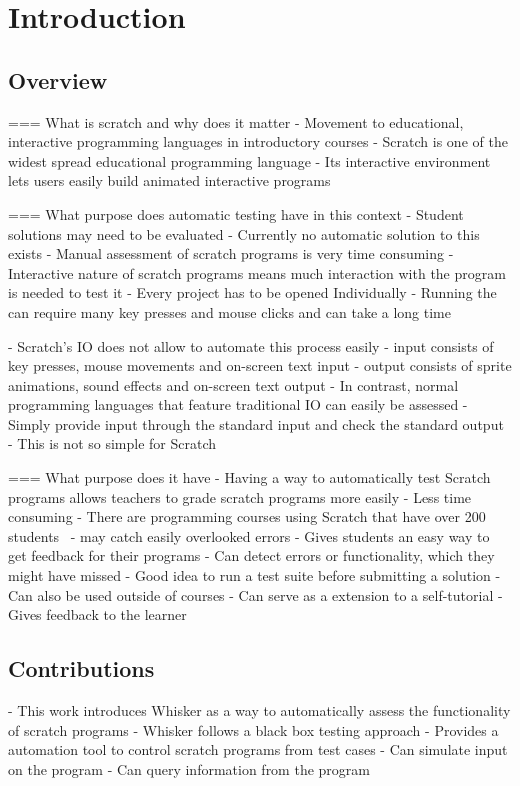 \chapter{Introduction}

\section{Overview}
=== What is scratch and why does it matter
- Movement to educational, interactive programming languages in introductory courses
- Scratch is one of the widest spread educational programming language
- Its interactive environment lets users easily build animated interactive programs

=== What purpose does automatic testing have in this context
- Student solutions may need to be evaluated
- Currently no automatic solution to this exists
- Manual assessment of scratch programs is very time consuming
- Interactive nature of scratch programs means much interaction with the program is needed to test it
- Every project has to be opened Individually
- Running the can require many key presses and mouse clicks and can take a long time

- Scratch's IO does not allow to automate this process easily
    - input consists of key presses, mouse movements and on-screen text input
    - output consists of sprite animations, sound effects and on-screen text output
- In contrast, normal programming languages that feature traditional IO can easily be assessed
- Simply provide input through the standard input and check the standard output
- This is not so simple for Scratch

=== What purpose does it have
- Having a way to automatically test Scratch programs allows teachers to grade scratch programs more easily
    - Less time consuming
        - There are programming courses using Scratch that have over 200 students~\cite{itch}
    - may catch easily overlooked errors
    - Gives students an easy way to get feedback for their programs
        - Can detect errors or functionality, which they might have missed
        - Good idea to run a test suite before submitting a solution
- Can also be used outside of courses
    - Can serve as a extension to a self-tutorial
    - Gives feedback to the learner

\section{Contributions}
- This work introduces Whisker as a way to automatically assess the functionality of scratch programs
- Whisker follows a black box testing approach
- Provides a automation tool to control scratch programs from test cases
    - Can simulate input on the program
    - Can query information from the program

